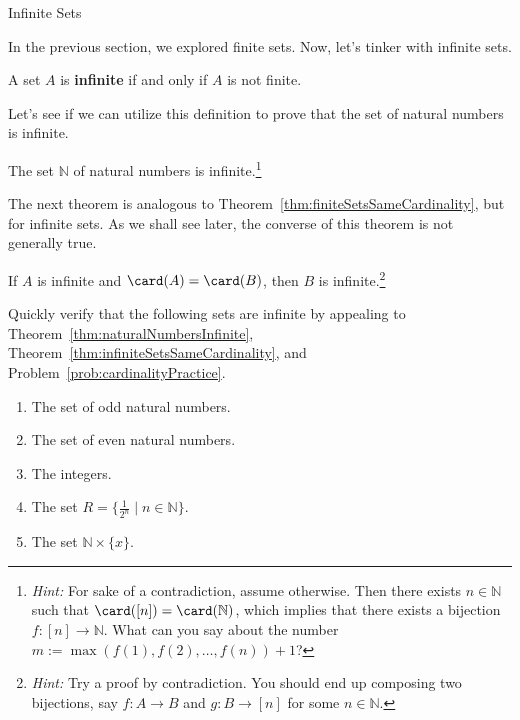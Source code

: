 \begin{section}{Infinite Sets}

In the previous section, we explored finite sets.  Now, let's tinker with infinite sets.

\begin{definition}\label{def:infiniteSet}
A set $A$ is \textbf{infinite} if and only if $A$ is not finite.
\end{definition}

Let's see if we can utilize this definition to prove that the set of natural numbers is infinite.

\begin{theorem}\label{thm:naturalNumbersInfinite}
The set $\mathbb{N}$ of natural numbers is infinite.\footnote{\emph{Hint:} For sake of a contradiction, assume otherwise.  Then there exists $n\in\mathbb{N}$ such that $\card([n])=\card(\mathbb{N})$, which implies that there exists a bijection $f:[n]\to \mathbb{N}$. What can you say about the number $m:=\max(f(1),f(2),\ldots,f(n))+1$?}
\end{theorem}

The next theorem is analogous to Theorem~\ref{thm:finiteSetsSameCardinality}, but for infinite sets. As we shall see later, the converse of this theorem is not generally true.

\begin{theorem}\label{thm:infiniteSetsSameCardinality}
If $A$ is infinite and $\card(A)=\card(B)$, then $B$ is infinite.\footnote{\emph{Hint:} Try a proof by contradiction. You should end up composing two bijections, say $f:A\to B$ and $g:B\to [n]$ for some $n\in\mathbb{N}$.}
\end{theorem}

\begin{exercise}\label{exer:someInfiniteSets}
Quickly verify that the following sets are infinite by appealing to Theorem~\ref{thm:naturalNumbersInfinite}, Theorem~\ref{thm:infiniteSetsSameCardinality}, and Problem~\ref{prob:cardinalityPractice}.
\begin{enumerate}[label=\textrm{(\alph*)}]
\item The set of odd natural numbers.
\item The set of even natural numbers.
\item The integers.
\item The set $R=\{\frac{1}{2^n}\mid n\in \mathbb{N}\}$.
\item The set $\mathbb{N}\times \{x\}$.
\end{enumerate}
\end{exercise}


\end{section}
